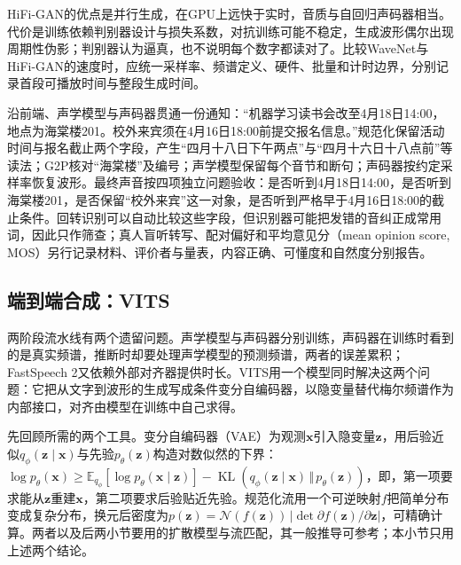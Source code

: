 HiFi-GAN的优点是并行生成，在GPU上远快于实时，音质与自回归声码器相当。代价是训练依赖判别器设计与损失系数，对抗训练可能不稳定，生成波形偶尔出现周期性伪影；判别器认为逼真，也不说明每个数字都读对了。比较WaveNet与HiFi-GAN的速度时，应统一采样率、频谱定义、硬件、批量和计时边界，分别记录首段可播放时间与整段生成时间。

沿前端、声学模型与声码器贯通一份通知：“机器学习读书会改至4月18日14:00，地点为海棠楼201。校外来宾须在4月16日18:00前提交报名信息。”规范化保留活动时间与报名截止两个字段，产生“四月十八日下午两点”与“四月十六日十八点前”等读法；G2P核对“海棠楼”及编号；声学模型保留每个音节和断句；声码器按约定采样率恢复波形。最终声音按四项独立问题验收：是否听到4月18日14:00，是否听到海棠楼201，是否保留“校外来宾”这一对象，是否听到严格早于4月16日18:00的截止条件。回转识别可以自动比较这些字段，但识别器可能把发错的音纠正成常用词，因此只作筛查；真人盲听转写、配对偏好和平均意见分（mean opinion score, MOS）另行记录材料、评价者与量表，内容正确、可懂度和自然度分别报告。

\subsection{端到端合成：VITS}
\label{sec:nlp-speech-vits}

两阶段流水线有两个遗留问题。声学模型与声码器分别训练，声码器在训练时看到的是真实频谱，推断时却要处理声学模型的预测频谱，两者的误差累积；FastSpeech 2又依赖外部对齐器提供时长。VITS用一个模型同时解决这两个问题：它把从文字到波形的生成写成条件变分自编码器，以隐变量替代梅尔频谱作为内部接口，对齐由模型在训练中自己求得。

先回顾所需的两个工具。变分自编码器（VAE）为观测$\bm{x}$引入隐变量$\bm{z}$，用后验近似$q_\phi(\bm{z}\mid\bm{x})$与先验$p_\theta(\bm{z})$构造对数似然的下界：$\log p_\theta(\bm{x})\geq\mathbb{E}_{q_\phi}[\log p_\theta(\bm{x}\mid\bm{z})]-\operatorname{KL}(q_\phi(\bm{z}\mid\bm{x})\,\Vert\,p_\theta(\bm{z}))$，即，第一项要求能从$\bm{z}$重建$\bm{x}$，第二项要求后验贴近先验。规范化流用一个可逆映射$f$把简单分布变成复杂分布，换元后密度为$p(\bm{z})=\mathcal{N}(f(\bm{z}))\,\lvert\det\partial f(\bm{z})/\partial\bm{z}\rvert$，可精确计算。两者以及后两小节要用的扩散模型与流匹配，其一般推导可参考；本小节只用上述两个结论。

